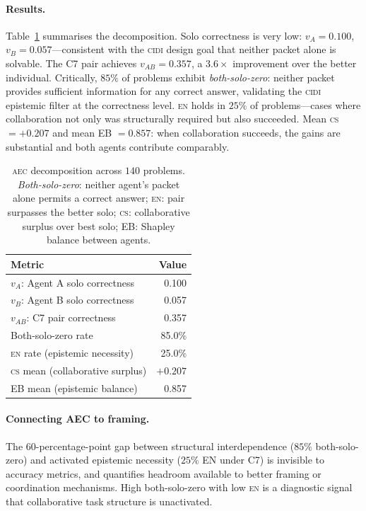 \documentclass{article}
\newcommand{\CIDI}{\textsc{cidi}}
\newcommand{\AEC}{\textsc{aec}}
\newcommand{\EN}{\textsc{en}}
\newcommand{\CS}{\textsc{cs}}
\begin{document}
\paragraph{Results.}
Table~\ref{tab:aec} summarises the decomposition. Solo correctness is
very low: $v_A = 0.100$, $v_B = 0.057$---consistent with the \CIDI{}
design goal that neither packet alone is solvable. The C7 pair achieves
$v_{AB} = 0.357$, a $3.6\times$ improvement over the better individual.
Critically, $85\%$ of problems exhibit \emph{both-solo-zero}: neither
packet provides sufficient information for any correct answer, validating
the \CIDI{} epistemic filter at the correctness level. \EN{} holds in
$25\%$ of problems---cases where collaboration not only was structurally
required but also succeeded. Mean \CS{} $= +0.207$ and mean EB $=
0.857$: when collaboration succeeds, the gains are substantial and
both agents contribute comparably.

\begin{table}[t]
  \caption{\AEC{} decomposition across $140$ problems. \emph{Both-solo-zero}:
  neither agent's packet alone permits a correct answer; \EN: pair
  surpasses the better solo; \CS: collaborative surplus over best solo;
  EB: Shapley balance between agents.}
  \label{tab:aec}
  \centering
  \begin{tabular}{lr}
    \toprule
    \textbf{Metric} & \textbf{Value} \\
    \midrule
    $v_A$: Agent A solo correctness  & 0.100 \\
    $v_B$: Agent B solo correctness  & 0.057 \\
    $v_{AB}$: C7 pair correctness    & 0.357 \\
    \midrule
    Both-solo-zero rate              & 85.0\% \\
    \EN{} rate (epistemic necessity) & 25.0\% \\
    \CS{} mean (collaborative surplus)  & $+0.207$ \\
    EB mean (epistemic balance)      & 0.857  \\
    \bottomrule
  \end{tabular}
\end{table}

\paragraph{Connecting AEC to framing.}
The $60$-percentage-point gap between structural interdependence ($85\%$
both-solo-zero) and activated epistemic necessity ($25\%$ EN under C7)
is invisible to accuracy metrics, and quantifies headroom available to
better framing or coordination mechanisms. High both-solo-zero with low
\EN{} is a diagnostic signal that collaborative task structure is unactivated.
\end{document}
